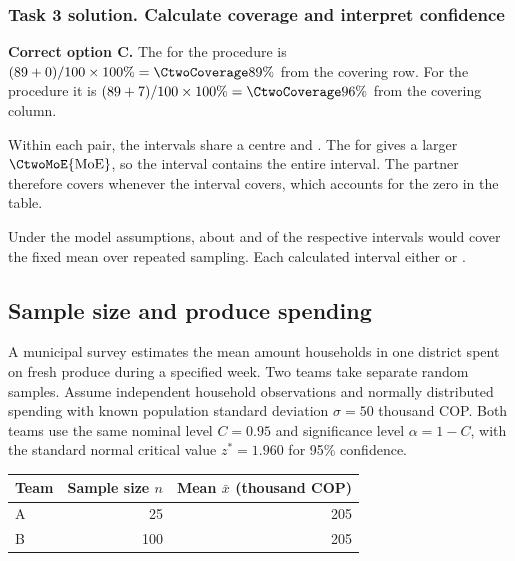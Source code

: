 \noindent\begin{minipage}{\linewidth}
\subsubsection*{Task 3 solution. Calculate coverage and interpret confidence}
\label{sol:c2-4-c}

\textbf{Correct option C.} The  for the  procedure is $(89+0)/100\times100\%=\CtwoCoverage{89\%}$ from the covering row. For the  procedure it is $(89+7)/100\times100\%=\CtwoCoverage{96\%}$ from the covering column.

Within each pair, the intervals share a centre and . The  for  gives a larger $\CtwoMoE{\mathrm{MoE}}$, so the  interval contains the entire  interval. The  partner therefore covers whenever the  interval covers, which accounts for the zero in the table.

Under the model assumptions, about  and  of the respective intervals would cover the fixed mean over repeated sampling. Each calculated interval either  or .

\par\vspace{3mm}
\end{minipage}\par

\clearpage

\subsection{Sample size and produce spending}
\label{prob:c2-5}

A municipal survey estimates the mean amount households in one district spent on fresh produce during a specified week. Two teams take separate random samples. Assume independent household observations and normally distributed spending with known population standard deviation $\sigma=50$ thousand COP. Both teams use the same nominal level $C=0.95$ and significance level $\alpha=1-C$, with the standard normal critical value $z^*=1.960$ for 95\% confidence.

\begin{center}
\begin{tabular}{@{}lrr@{}}
    \toprule
    Team & Sample size $n$ & Mean $\bar{x}$ (thousand COP) \\
    \midrule
    A & 25 & 205 \\
    B & 100 & 205 \\
    \bottomrule
\end{tabular}
\end{center}

